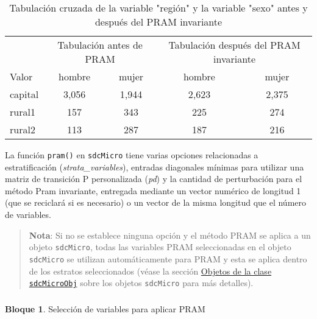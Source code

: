 \documentclass[
]{book}
\theoremstyle{definition}
\theoremstyle{definition}
\newtheorem{example}{Bloque}[chapter]
\theoremstyle{definition}
\theoremstyle{definition}
\theoremstyle{remark}
\begin{document}
\begin{table}

\caption{\label{tab:Tabla15}\label{tab:Tabla15}Tabulación cruzada de la variable "región" y la variable "sexo" antes y después del PRAM invariante}
\centering
\begin{tabular}[t]{lcccc}
\toprule
\multicolumn{1}{c}{ } & \multicolumn{2}{c}{Tabulación antes de PRAM} & \multicolumn{2}{c}{Tabulación después del PRAM invariante} \\
\cmidrule(l{3pt}r{3pt}){2-3} \cmidrule(l{3pt}r{3pt}){4-5}
Valor & hombre & mujer & hombre & mujer\\
\midrule
capital & 3,056 & 1,944 & 2,623 & 2,375\\
rural1 & 157 & 343 & 225 & 274\\
rural2 & 113 & 287 & 187 & 216\\
\bottomrule
\end{tabular}
\end{table}

La función \texttt{pram()} en \texttt{sdcMicro} tiene varias opciones relacionadas a estratificación (\emph{strata\_variables}), entradas diagonales mínimas para utilizar una matriz de transición P personalizada (\emph{pd}) y la cantidad de perturbación para el método Pram invariante, entregada mediante un vector numérico de longitud 1 (que se reciclará si es necesario) o un vector de la misma longitud que el número de variables.

\begin{quote}
\textbf{Nota}: Si no se establece ninguna opción y el método PRAM se aplica a un objeto \texttt{sdcMicro}, todas las variables PRAM seleccionadas en el objeto \texttt{sdcMicro} se utilizan automáticamente para PRAM y esta se aplica dentro de los estratos seleccionados (véase la sección \protect\hyperlink{objetos-de-la-clase-sdcmicroobj}{Objetos de la clase \texttt{sdcMicroObj}} sobre los objetos \texttt{sdcMicro} para más detalles).
\end{quote}

\hypertarget{section-1}{%
\subsubsection{}\label{section-1}}

\begin{example}
\protect\hypertarget{exm:bloque27jgm}{}\label{exm:bloque27jgm}Selección de variables para aplicar PRAM
\end{example}
\end{document}
